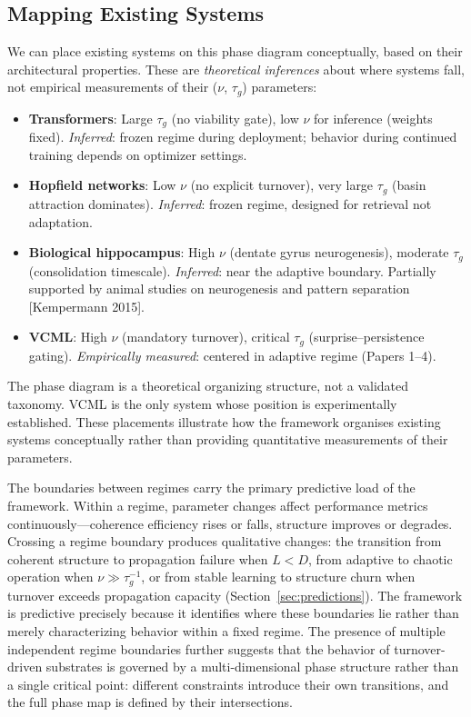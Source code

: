 \documentclass[11pt]{article}
\begin{document}
\subsection{Mapping Existing Systems}

We can place existing systems on this phase diagram conceptually, based on their architectural properties. These are \emph{theoretical inferences} about where systems fall, not empirical measurements of their ($\nu$, $\tau_g$) parameters:

\begin{itemize}
\item \textbf{Transformers}: Large $\tau_g$ (no viability gate), low $\nu$ for inference (weights fixed). \textit{Inferred}: frozen regime during deployment; behavior during continued training depends on optimizer settings.

\item \textbf{Hopfield networks}: Low $\nu$ (no explicit turnover), very large $\tau_g$ (basin attraction dominates). \textit{Inferred}: frozen regime, designed for retrieval not adaptation.

\item \textbf{Biological hippocampus}: High $\nu$ (dentate gyrus neurogenesis), moderate $\tau_g$ (consolidation timescale). \textit{Inferred}: near the adaptive boundary. Partially supported by animal studies on neurogenesis and pattern separation [Kempermann 2015].

\item \textbf{VCML}: High $\nu$ (mandatory turnover), critical $\tau_g$ (surprise--persistence gating). \textit{Empirically measured}: centered in adaptive regime (Papers 1--4).
\end{itemize}

The phase diagram is a theoretical organizing structure, not a validated taxonomy. VCML is the only system whose position is experimentally established.
These placements illustrate how the framework organises existing systems conceptually rather than providing quantitative measurements of their parameters.

The boundaries between regimes carry the primary predictive load of the framework. Within a regime, parameter changes affect performance metrics continuously---coherence efficiency rises or falls, structure improves or degrades. Crossing a regime boundary produces qualitative changes: the transition from coherent structure to propagation failure when $L < D$, from adaptive to chaotic operation when $\nu \gg \tau_g^{-1}$, or from stable learning to structure churn when turnover exceeds propagation capacity (Section~\ref{sec:predictions}). The framework is predictive precisely because it identifies where these boundaries lie rather than merely characterizing behavior within a fixed regime. The presence of multiple independent regime boundaries further suggests that the behavior of turnover-driven substrates is governed by a multi-dimensional phase structure rather than a single critical point: different constraints introduce their own transitions, and the full phase map is defined by their intersections.
\end{document}
